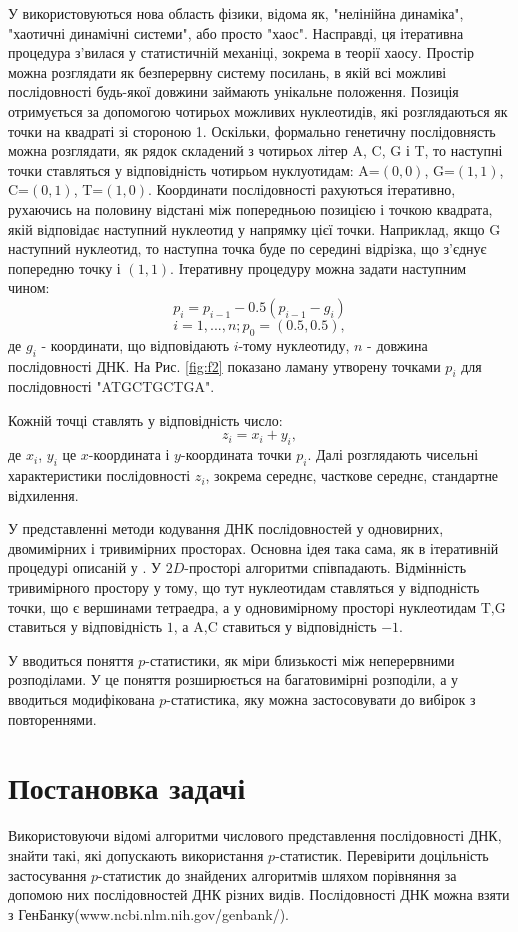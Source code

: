 \documentclass[14pt]{extarticle}
\begin{document}
У \cite{l3} використовуються нова область фізики, відома як, "нелінійна динаміка", "хаотичні динамічні системи", або просто "хаос". Насправді, ця ітеративна процедура з’вилася у статистичній механіці, зокрема в теорії хаосу.
Простір можна розглядати як безперервну систему посилань, в якій всі можливі послідовності будь-якої довжини займають унікальне положення. Позиція отримується за допомогою чотирьох можливих нуклеотидів, які розглядаються як точки на квадраті зі стороною 1. Оскільки, формально генетичну послідовнясть можна розглядати, як рядок складений з чотирьох літер A, C, G і T, то наступні точки ставляться у відповідність чотирьом нуклуотидам: A=$(0,0)$, G=$(1,1)$, C=$(0,1)$, T=$(1,0)$. Координати послідовності рахуються ітеративно, рухаючись на половину відстані між попередньою позицією і точкою квадрата, якій відповідає наступний нуклеотид у напрямку цієї точки. Наприклад, якщо G наступний нуклеотид, то наступна точка буде по середині відрізка, що з’єднує попередню точку і $(1,1)$. Ітеративну процедуру можна задати наступним чином:
\[p_i = p_{i-1}-0.5(p_{i-1}-g_i)\]
\[i=1,...,n; p_0=(0.5,0.5),\]
де $g_i$ - координати, що відповідають $i$-тому нуклеотиду, $n$ - довжина послідовності ДНК. На Рис. \ref{fig:f2} показано ламану утворену точками $p_i$ для послідовності "ATGCTGCTGA".\par
Кожній точці ставлять у відповідність число:
\[z_i = x_i + y_i,\]
де $x_i$, $y_i$ це $x$-координата і $y$-координата точки $p_i$. Далі розглядають чисельні характеристики послідовності $z_i$, зокрема середнє, часткове середнє, стандартне відхилення.

У \cite{l4} представленні методи кодування ДНК послідовностей у одновирних, двомимірних і тривимірних просторах. Основна ідея така сама, як в ітеративній процедурі описаній у \cite{l3}. У $2D$-просторі алгоритми співпадають. Відмінність тривимірного простору у тому, що тут нуклеотидам ставляться у відподність точки, що є вершинами тетраедра, а у одновимірному просторі нуклеотидам T,G ставиться у відповідність $1$, а A,C ставиться у відповідність $-1$.

У \cite{l5} вводиться поняття $p$-статистики, як міри близькості між неперервними розподілами. У \cite{l6} це поняття розширюється на багатовимірні розподіли, а у \cite{l7} вводиться модифікована $p$-статистика, яку можна застосовувати до вибірок з повтореннями.

\newpage
\section{Постановка задачі}
Використовуючи відомі алгоритми числового представлення послідовності ДНК, знайти такі, які допускають використання $p$-статистик. Перевірити доцільність застосування $p$-статистик до знайдених алгоритмів шляхом порівняння за допомою них послідовностей ДНК різних видів. Послідовності ДНК можна взяти з ГенБанку(www.ncbi.nlm.nih.gov/genbank/).
\end{document}
